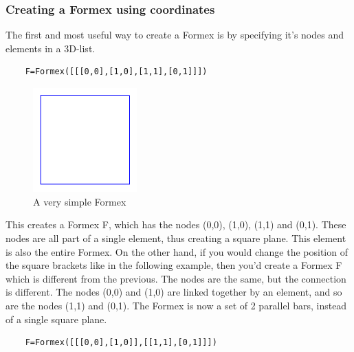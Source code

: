 {\subsubsection{Creating a Formex using coordinates}
The first and most useful way to create a Formex is by specifying it's nodes and elements in a 3D-list.  

\begin{verbatim}
	F=Formex([[[0,0],[1,0],[1,1],[0,1]]])
\end{verbatim}

\begin{figure}[h]
  \centering
  \begin{makeimage}
  \end{makeimage}
  \begin{latexonly}
    \includegraphics[width=4cm]{images/square}
  \end{latexonly}
  \begin{htmlonly}
  \end{htmlonly}  
  \caption{A very simple Formex}
  \label{fig:square}
\end{figure}

This creates a Formex F, which has the nodes (0,0), (1,0), (1,1) and (0,1). These nodes are all part of a single element, thus creating a square plane. This element is also the entire Formex.
On the other hand, if you would change the position of the square brackets like in the following example, then you'd create a Formex F which is different from the previous. The nodes are the same, but the connection is different. The nodes (0,0) and (1,0) are linked together by an element, and so are the nodes (1,1) and (0,1). The Formex is now a set of 2 parallel bars, instead of a single square plane. 
\begin{verbatim}
	F=Formex([[[0,0],[1,0]],[[1,1],[0,1]]])
\end{verbatim}

}
